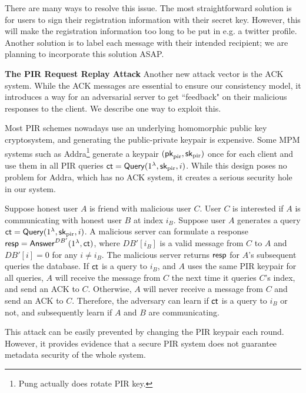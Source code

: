 There are many ways to resolve this issue. The most straightforward solution is for users to sign their registration information with their secret key. However, this will make the registration information too long to be put in e.g. a twitter profile. Another solution is to label each message with their intended recipient; we are planning to incorporate this solution ASAP.

\textbf{The PIR Request Replay Attack} Another new attack vector is the ACK system. While the ACK messages are essential to ensure our consistency model, it introduces a way for an adversarial server to get ``feedback" on their malicious responses to the client. We describe one way to exploit this.

Most PIR schemes nowadays use an underlying homomorphic public key cryptosystem, and generating the public-private keypair is expensive. Some MPM systems such as Addra\footnote{Pung actually does rotate PIR key.} generate a keypair $(\mathsf{pk}_{\text{pir}}, {\mathsf{sk}}_{\text{pir}})$ once for each client and use them in all PIR queries $\mathsf{ct} = \mathsf{Query}(1^{\lambda}, {\mathsf{sk}}_{\text{pir}}, i)$. While this design poses no problem for Addra, which has no ACK system, it creates a serious security hole in our system. 

Suppose honest user $A$ is friend with malicious user $C$. User $C$ is interested if $A$ is communicating with honest user $B$ at index $i_B$. Suppose user $A$ generates a query $\mathsf{ct} = \mathsf{Query}(1^{\lambda}, {\mathsf{sk}}_{\text{pir}}, i)$. A malicious server can formulate a response $\mathsf{resp} = \mathsf{Answer}^{DB'}(1^{\lambda}, \mathsf{ct})$, where $DB'[i_B]$ is a valid message from $C$ to $A$ and $DB'[i] = 0$ for any $i \neq i_B$. The malicious server returns $\mathsf{resp}$ for $A$'s subsequent queries the database. If $\mathsf{ct}$ is a query to $i_B$, and $A$ uses the same PIR keypair for all queries, $A$ will receive the message from $C$ the next time it queries $C$'s index, and send an ACK to $C$. Otherwise, $A$ will never receive a message from $C$ and send an ACK to $C$. Therefore, the adversary can learn if $\mathsf{ct}$ is a query to $i_B$ or not, and subsequently learn if $A$ and $B$ are communicating.

This attack can be easily prevented by changing the PIR keypair each round. However, it provides evidence that a secure PIR system does not guarantee metadata security of the whole system.
